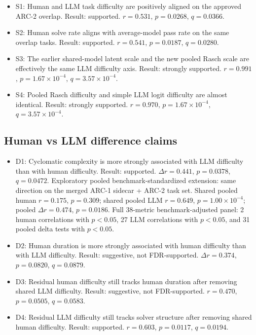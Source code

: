 \documentclass[11pt]{article}
\begin{document}
\begin{itemize}
  \item S1: Human and LLM task difficulty are positively aligned on the approved ARC-2 overlap. Result: supported. $r = 0.531$, $p = 0.0268$, $q = 0.0366$.
  \item S2: Human solve rate aligns with average-model pass rate on the same overlap tasks. Result: supported. $r = 0.541$, $p = 0.0187$, $q = 0.0280$.
  \item S3: The earlier shared-model latent scale and the new pooled Rasch scale are effectively the same LLM difficulty axis. Result: strongly supported. $r = 0.991$, $p = 1.67\times10^{-4}$, $q = 3.57\times10^{-4}$.
  \item S4: Pooled Rasch difficulty and simple LLM logit difficulty are almost identical. Result: strongly supported. $r = 0.970$, $p = 1.67\times10^{-4}$, $q = 3.57\times10^{-4}$.
\end{itemize}

\subsection*{Human vs LLM difference claims}

\begin{itemize}
  \item D1: Cyclomatic complexity is more strongly associated with LLM difficulty than with human difficulty. Result: supported. $\Delta r = 0.441$, $p = 0.0378$, $q = 0.0472$. Exploratory pooled benchmark-standardized extension: same direction on the merged ARC-1 sidecar + ARC-2 task set. Shared pooled human $r = 0.175$, $p = 0.309$; shared pooled LLM $r = 0.649$, $p = 1.00\times10^{-4}$; pooled $\Delta r = 0.474$, $p = 0.0186$. Full 38-metric benchmark-adjusted panel: 2 human correlations with $p < 0.05$, 27 LLM correlations with $p < 0.05$, and 31 pooled delta tests with $p < 0.05$.
  \item D2: Human duration is more strongly associated with human difficulty than with LLM difficulty. Result: suggestive, not FDR-supported. $\Delta r = 0.374$, $p = 0.0820$, $q = 0.0879$.
  \item D3: Residual human difficulty still tracks human duration after removing shared LLM difficulty. Result: suggestive, not FDR-supported. $r = 0.470$, $p = 0.0505$, $q = 0.0583$.
  \item D4: Residual LLM difficulty still tracks solver structure after removing shared human difficulty. Result: supported. $r = 0.603$, $p = 0.0117$, $q = 0.0194$.
\end{itemize}
\end{document}
